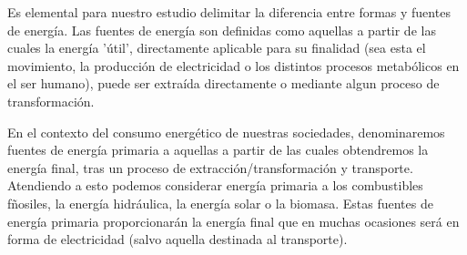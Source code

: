 
Es elemental para nuestro estudio delimitar la diferencia entre formas y fuentes de energía. Las fuentes de energía son definidas como aquellas a partir de las cuales la energía 'útil', directamente aplicable para su finalidad (sea esta el movimiento, la producción de electricidad o los distintos procesos metabólicos en el ser humano), puede ser extraída directamente o mediante algun proceso de transformación.


En el contexto del consumo energético de nuestras sociedades, denominaremos fuentes de energía primaria a aquellas a partir de las cuales obtendremos la energía final, tras un proceso de extracción/transformación y transporte. Atendiendo a esto podemos considerar energía primaria a los combustibles fñosiles, la energía hidráulica, la energía solar o la biomasa. Estas fuentes de energía primaria proporcionarán la energía final que en muchas ocasiones será en forma de electricidad (salvo aquella destinada al transporte).



